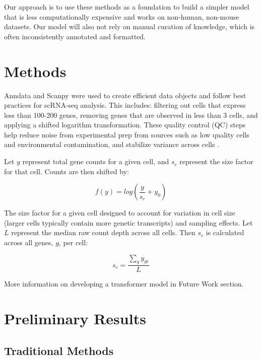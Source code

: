 \documentclass{article}
\begin{document}
Our approach is to use these methods as a foundation to build a simpler model that is less computationally expensive and works on non-human, non-mouse datasets. Our model will also not rely on manual curation of knowledge, which is often inconsistently annotated and formatted.

\section{Methods}

Anndata \cite{virshupAnndataAnnotatedData2021} and Scanpy \cite{wolfSCANPYLargescaleSinglecell2018} were used to create efficient data objects and  follow best practices for scRNA-seq analysis. This includes: filtering out cells that express less than 100-200 genes, removing genes that are observed in less than 3 cells, and applying a shifted logarithm transformation. These quality control (QC) steps help reduce noise from experimental prep from sources such as low quality cells and environmental contamination, and stabilize variance across cells \cite{heumosBestPracticesSinglecell2023}. 

Let \(y\) represent total gene counts for a given cell, and \(s_c\) represent the size factor for that cell. Counts are then shifted by:

\begin{displaymath}
f(y) = log\left(\frac{y}{s_c} + y_0 \right)
\end{displaymath}

The size factor for a given cell designed to account for variation in cell size (larger cells typically contain more genetic transcripts) and sampling effects. Let \(L\) represent the median raw count depth across all cells. Then \(s_c\) is calculated across all genes, \(g\), per cell: 

\begin{displaymath}
s_c = \frac{\sum_g y_{gc}}{L}
\end{displaymath}

More information on developing a transformer model in Future Work section. 

\section{Preliminary Results}

\subsection{Traditional Methods}
\end{document}
